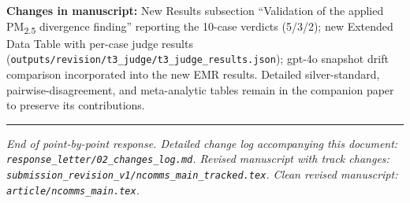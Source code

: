 \documentclass[11pt,a4paper]{article}
\newcommand{\changes}[1]{\par\noindent\textbf{\color{revblue}Changes in manuscript:} #1\par}
\begin{document}
\changes{New Results subsection ``Validation of the applied PM\textsubscript{2.5} divergence finding'' reporting the 10-case verdicts (5/3/2); new Extended Data Table with per-case judge results (\texttt{outputs/revision/t3\_judge/t3\_judge\_results.json}); gpt-4o snapshot drift comparison incorporated into the new EMR results. Detailed silver-standard, pairwise-disagreement, and meta-analytic tables remain in the companion paper to preserve its contributions.}

\bigskip\bigskip
\hrule
\bigskip

\noindent\emph{End of point-by-point response. Detailed change log accompanying this document: \texttt{response\_letter/02\_changes\_log.md}. Revised manuscript with track changes: \texttt{submission\_revision\_v1/ncomms\_main\_tracked.tex}. Clean revised manuscript: \texttt{article/ncomms\_main.tex}.}
\end{document}
